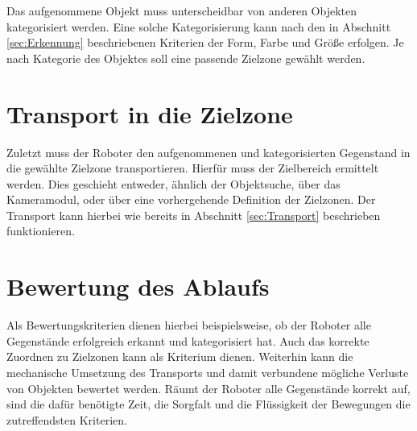 Das aufgenommene Objekt muss unterscheidbar von anderen Objekten kategorisiert werden. Eine solche Kategorisierung kann nach den in Abschnitt \ref{sec:Erkennung} beschriebenen Kriterien der Form, Farbe und Größe erfolgen. Je nach Kategorie des Objektes soll eine passende Zielzone gewählt werden.

\section{Transport in die Zielzone}

Zuletzt muss der Roboter den aufgenommenen und kategorisierten Gegenstand in die gewählte Zielzone transportieren. Hierfür muss der Zielbereich ermittelt werden. Dies geschieht entweder, ähnlich der Objektsuche, über das Kameramodul, oder über eine vorhergehende Definition der Zielzonen. Der Transport kann hierbei wie bereits in Abschnitt \ref{sec:Transport} beschrieben funktionieren. 

\section{Bewertung des Ablaufs}
\label{sec:Bewertung}

Als Bewertungskriterien dienen hierbei beispielsweise, ob der Roboter alle Gegenstände erfolgreich erkannt und kategorisiert hat. Auch das korrekte Zuordnen zu Zielzonen kann als Kriterium dienen. Weiterhin kann die mechanische Umsetzung des Transports und damit verbundene mögliche Verluste von Objekten bewertet werden. Räumt der Roboter alle Gegenstände korrekt auf, sind die dafür benötigte Zeit, die Sorgfalt und die Flüssigkeit der Bewegungen die zutreffendsten Kriterien.